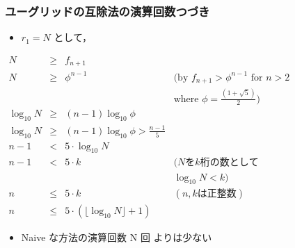 \begin{frame}
\frametitle{ユーグリッドの互除法の演算回数\textemdash つづき}
  \begin{itemize}
\item $r_1=N$ として，
  \end{itemize}
  \begin{center}  
    \begin{math}
      \begin{array}{rcll}
N&\ge& f_{n+1}\\
N&\ge& \phi^{n-1}&(\mbox{by }f_{n+1}>\phi^{n-1} \mbox{ for }n>2\\
                &&&\mbox{where }\phi=\frac{(1+\sqrt{5})}{2})\\
\log_{10}N&\ge&(n-1)\log_{10}\phi\\
\log_{10}N&\ge&(n-1)\log_{10}\phi>\frac{n-1}{5}\\
n-1&<&5\cdot\log_{10}N\\
n-1&<&5\cdot k&(N を k 桁の数として\\
              &&& \log_{10}N<k)\\
n&\leq&5\cdot k&(n, k は正整数)\\
n&\leq&5\cdot (\lfloor\log_{10}N\rfloor+1)
      \end{array}
    \end{math}
  \end{center}
  \begin{itemize}
\item Naive な方法の演算回数 N 回 よりは少ない
  \end{itemize}
\end{frame}

